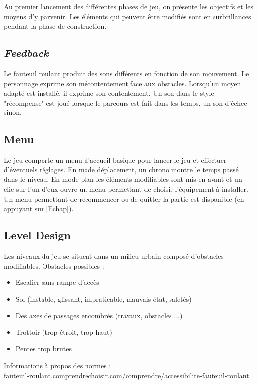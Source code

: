 \documentclass[a4paper,11pt]{article}
\begin{document}
Au premier lancement des différentes phases de jeu, on présente les objectifs et les moyens d’y parvenir.
Les éléments qui peuvent être modifiés sont en surbrillances pendant la phase de construction.

\subsection{\textit{Feedback}}
Le fauteuil roulant produit des sons différents en fonction de son mouvement. Le personnage exprime son mécontentement face aux obstacles. Lorsqu’un moyen adapté est installé, il exprime son contentement. Un son dans le style "récompense" est joué lorsque le parcours est fait dans les temps, un son d’échec sinon.

\subsection{Menu}

Le jeu comporte un menu d’accueil basique pour lancer le jeu et effectuer d’éventuels réglages. En mode déplacement, un chrono montre le temps passé dans le niveau. En mode plan les éléments modifiables sont mis en avant et un clic sur l’un d’eux ouvre un menu permettant de choisir l’équipement à installer. Un menu permettant de recommencer ou de quitter la partie est disponible (en appuyant sur [Echap]).

\subsection{Level Design}

Les niveaux du jeu se situent dans un milieu urbain composé d’obstacles modifiables.
Obstacles possibles :
\begin{itemize}
\item Escalier sans rampe d’accès
\item Sol (instable, glissant, impraticable, mauvais état, saletés)
\item Des axes de passages encombrés (travaux, obstacles ...)
\item Trottoir (trop étroit, trop haut)
\item Pentes trop brutes
\end{itemize}

Informations à propos des normes :\\\href{http://fauteuil-roulant.comprendrechoisir.com/comprendre/accessibilite-fauteuil-roulant}{fauteuil-roulant.comprendrechoisir.com/comprendre/accessibilite-fauteuil-roulant}
\end{document}
